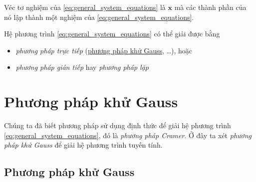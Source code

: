 \documentclass[../../Lectures]{subfiles}
\begin{document}
Véc tơ nghiệm của \eqref{eq:general_system_equations} là \(\bm{x}\) mà các thành
phần của nó lập thành một nghiệm của \eqref{eq:general_system_equations}.

Hệ phương trình \eqref{eq:general_system_equations} có thể giải được bằng
\begin{itemize}
    \item \emph{phương pháp trực tiếp}
        (\hyperref[method:gauss_elimination]{phương pháp khử Gauss}, \ldots),
        hoặc
    \item \emph{phương pháp gián tiếp} hay \emph{phương pháp lặp}
\end{itemize}



\section{Phương pháp khử Gauss}\label{sec:gauss_elimination}

Chúng ta đã biết phương pháp sử dụng định thức để giải hệ phương trình
\eqref{eq:general_system_equations}, đó là \emph{phương pháp Cramer}. Ở đây ta
xét \emph{phương pháp khử Gauss} để giải hệ phương trình tuyến tính.

\subsection{Phương pháp khử Gauss}
\end{document}
